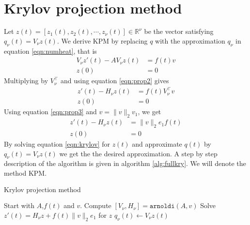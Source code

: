 \section{Krylov projection method} \label{sec:fullKPM}

Let $z(t) = [z_1(t), z_2(t), \cdots, z_\nu(t)] \in \mathbb{R}^\nu $ be the vector satisfying $q_\nu(t) = V_\nu z(t)$. 
We derive KPM by replacing $q$ with the approximation $q_\nu$ in equation \eqref{eqn:numheat}, that is
\begin{equation}  \begin{aligned} \label{eqn:KPMtemp1}
V_\nu z'(t) - A V_\nu z(t) &= f(t) v \\
z(0)& = 0
\end{aligned} \end{equation}
Multiplying by $V_\nu^{\top}$ and using equation \eqref{eqn:prop2} gives
\begin{equation*} 
\begin{aligned} \label{eqn:KPMtemp2}
z'(t)-H_\nu z(t) &= f(t) V_\nu^{\top}  v  \\
z(0)& = 0
\end{aligned}
\end{equation*}
Using equation \eqref{eqn:prop3} and $v = \|v \|_2 v_1 $, we get
\begin{equation} 
\begin{aligned} \label{eqn:krylov}
z'(t) -H_\nu z(t) &=  \|v \|_2 e_1 f(t)\\
z(0)& = 0
\end{aligned}
\end{equation}
By solving equation \eqref{eqn:krylov} for $z(t)$ and approximate $q(t)$ by $ q_\nu(t) = V_\nu z(t) $ we get the the desired approximation. A step by step description of the algorithm is given in algorithm \ref{alg:fullkry}. 
 We will denote the method KPM.\\
\begin{algorithm}
\begin{algorithmic} \caption{Krylov projection method} \label{alg:fullkry} 
\STATE Start with $A$,$f(t)$ and $v$.
\STATE Compute $[V_\nu ,H_\nu] = \texttt{arnoldi}(A,v)$
\STATE Solve $  z'(t) = H_\nu z + f(t) \| v \|_2 e_1  $ for $z$
\STATE $ q_\nu (t) \leftarrow  V_\nu z(t) $
\end{algorithmic} 
\end{algorithm}

